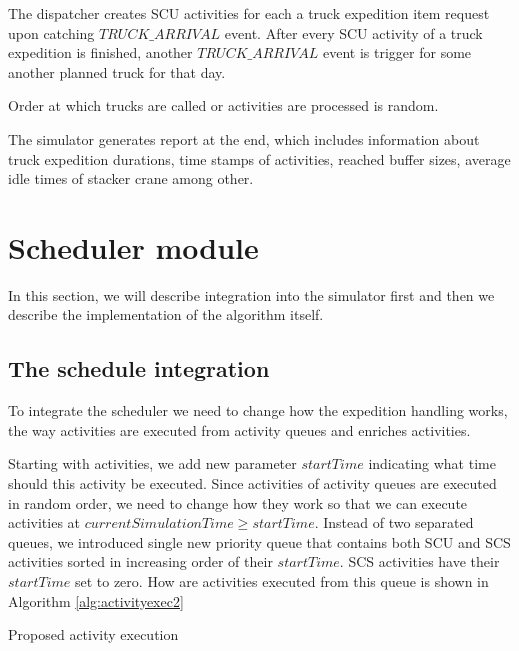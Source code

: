 \documentclass{ctuthesis}
\begin{document}
The dispatcher creates SCU activities for each a truck expedition item request upon catching $TRUCK\_ARRIVAL$ event. After every SCU activity of a truck expedition is finished, another $TRUCK\_ARRIVAL$ event is trigger for some another planned truck for that day.  

Order at which trucks are called or activities are processed is random.

The simulator generates report at the end, which includes information about truck expedition durations, time stamps of activities, reached buffer sizes, average idle times of stacker crane among other.

\section{Scheduler module}

In this section, we will describe integration into the simulator first and then we describe the implementation of the algorithm itself.

\subsection{The schedule integration}
\label{subsec:scheduleintegration}

To integrate the scheduler we need to change how the expedition handling works, the way activities are executed from activity queues and enriches activities. 

Starting with activities, we add new parameter $startTime$ indicating what time should this activity be executed. Since activities of activity queues are executed in random order, we need to change how they work so that we can execute activities at $currentSimulationTime \geq startTime$. Instead of two separated queues,  we introduced single new priority queue that contains both SCU and SCS activities sorted in increasing order of their $startTime$. SCS activities have their $startTime$ set to zero. How are activities executed from this queue is shown in Algorithm \ref{alg:activityexec2}

\begin{algorithm}[H]
\SetAlgoLined
{
}
\caption{Proposed activity execution}
\label{alg:activityexec2}
\end{algorithm}
\end{document}
